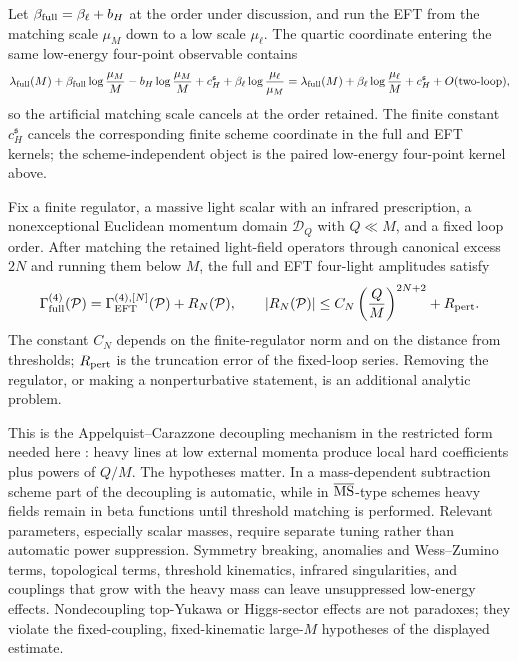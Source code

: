 Let \(\beta_{\rm full}=\beta_\ell+b_H\) at the order under discussion, and
run the EFT from the matching scale \(\mu_M\) down to a low scale
\(\mu_\ell\).  The quartic coordinate entering the same low-energy four-point
observable contains
\begin{equation}
  \lambda_{\rm full}(M)
  +
  \beta_{\rm full}\log\frac{\mu_M}{M}
  -
  b_H\log\frac{\mu_M}{M}
  +
  c_H^{\mathfrak s}
  +
  \beta_\ell\log\frac{\mu_\ell}{\mu_M}
  =
  \lambda_{\rm full}(M)
  +
  \beta_\ell\log\frac{\mu_\ell}{M}
  +
  c_H^{\mathfrak s}
  +
  O(\hbox{two-loop}),
  \label{eq:heavy-light-rg-scale-cancellation}
\end{equation}
so the artificial matching scale cancels at the order retained.  The finite
constant \(c_H^{\mathfrak s}\) cancels the corresponding finite scheme
coordinate in the full and EFT kernels; the scheme-independent object is the
paired low-energy four-point kernel above.

\begin{controlledapproximation}
\label{ca:heavy-scalar-decoupling-low-energy}
Fix a finite regulator, a massive light scalar with an infrared prescription,
a nonexceptional Euclidean momentum domain \(\mathcal D_Q\) with
\(Q\ll M\), and a fixed loop order.  After matching the retained light-field
operators through canonical excess \(2N\) and running them below \(M\), the
full and EFT four-light amplitudes satisfy
\[
  \Gamma_{\rm full}^{(4)}(\mathcal P)
  =
  \Gamma_{\rm EFT}^{(4),[N]}(\mathcal P)
  +
  R_N(\mathcal P),
  \qquad
  |R_N(\mathcal P)|
  \le
  C_N
  \left(\frac{Q}{M}\right)^{2N+2}
  +
  R_{\rm pert}.
 \]
The constant \(C_N\) depends on the finite-regulator norm and on the distance
from thresholds; \(R_{\rm pert}\) is the truncation error of the fixed-loop
series.  Removing the regulator, or making a nonperturbative statement, is an
additional analytic problem.
\end{controlledapproximation}

This is the Appelquist--Carazzone decoupling mechanism in the restricted form
needed here \cite{AppelquistCarazzone1975}: heavy lines at low external
momenta produce local hard coefficients plus powers of \(Q/M\).  The
hypotheses matter.  In a mass-dependent subtraction scheme part of the
decoupling is automatic, while in \(\overline{\rm MS}\)-type schemes heavy
fields remain in beta functions until threshold matching is performed.
Relevant parameters, especially scalar masses, require separate tuning rather
than automatic power suppression.  Symmetry breaking, anomalies and
Wess--Zumino terms, topological terms, threshold kinematics, infrared
singularities, and couplings that grow with the heavy mass can leave
unsuppressed low-energy effects.  Nondecoupling top-Yukawa or Higgs-sector
effects are not paradoxes; they violate the fixed-coupling, fixed-kinematic
large-\(M\) hypotheses of the displayed estimate.

